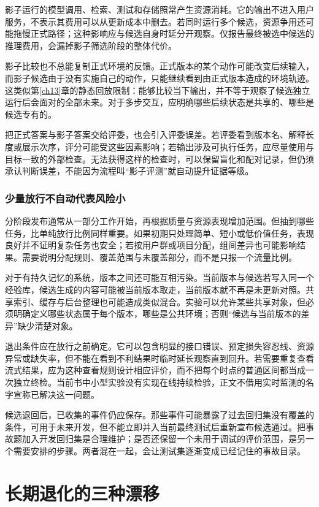 影子运行的模型调用、检索、测试和存储照常产生资源消耗。它的输出不进入用户服务，不表示其费用可以从更新成本中删去。若同时运行多个候选，资源争用还可能拖慢正式路径；这种影响应与候选自身时延分开观察。仅报告最终被选中候选的推理费用，会漏掉影子筛选阶段的整体代价。

影子比较也不总能复制正式环境的反馈。正式版本的某个动作可能改变后续输入，而影子候选由于没有实施自己的动作，只能继续看到由正式版本造成的环境轨迹。这类似第\ref{ch13}章的静态回放限制：能够比较当下输出，并不等于观察了候选独立运行后会面对的全部未来。对于多步交互，应明确哪些后续状态是共享的、哪些是候选专有的。

把正式答案与影子答案交给评委，也会引入评委误差。若评委看到版本名、解释长度或展示次序，评分可能受这些因素影响；若输出涉及可执行任务，应尽量使用与目标一致的外部检查。无法获得这样的检查时，可以保留盲化和配对记录，但仍须承认判断误差，不能因为流程叫“影子评测”就自动提升证据等级。

\subsubsection{少量放行不自动代表风险小}

分阶段发布通常从一部分工作开始，再根据质量与资源表现增加范围。但抽到哪些任务，比单纯放行比例同样重要。如果初期只处理简单、短小或低价值任务，表现良好并不证明复杂任务也安全；若按用户群或项目分配，组间差异也可能影响结果。需要说明分配规则、覆盖范围与未覆盖部分，而不是只报一个流量比例。

对于有持久记忆的系统，版本之间还可能互相污染。当前版本与候选若写入同一个经验库，候选生成的内容可能被当前版本取走，当前版本就不再是未更新对照。共享索引、缓存与后台整理也可能造成类似混合。实验可以允许某些共享对象，但必须明确定义哪些状态属于每个版本，哪些是公共环境；否则“候选与当前版本的差异”缺少清楚对象。

退出条件应在放行之前确定。它可以包含明显的接口错误、预定损失容忍线、资源异常或缺失率，但不能在看到不利结果时临时延长观察直到回升。若需要重复查看流式结果，应为这种查看规则设计相应评价，而不把每个时点的普通区间都当成一次独立终检。当前书中小型实验没有实现在线持续检验，正文不借用实时监测的名字宣称已解决这一问题。

候选退回后，已收集的事件仍应保存。那些事件可能暴露了过去回归集没有覆盖的条件，可用于未来开发，但不能立即并入当前最终测试后重新宣布候选通过。把事故题加入开发回归集是合理维护；是否还保留一个未用于调试的评价范围，是另一个需要安排的步骤。两者混在一起，会让测试集逐渐变成已经记住的事故目录。

\section{长期退化的三种漂移}
\label{sec:ch14-drift}

